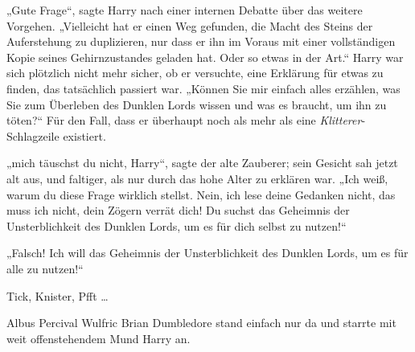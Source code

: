 „Gute Frage“, sagte Harry nach einer internen Debatte über das weitere Vorgehen.
„Vielleicht hat er einen Weg gefunden, die Macht des Steins der Auferstehung zu duplizieren, nur dass er ihn im Voraus mit einer vollständigen Kopie seines Gehirnzustandes geladen hat. Oder so etwas in der Art.“ Harry war sich plötzlich nicht mehr sicher, ob er versuchte, eine Erklärung für etwas zu finden, das tatsächlich passiert war.
„Können Sie mir einfach alles erzählen, was Sie zum Überleben des Dunklen Lords wissen und was es braucht, um ihn zu töten?“ Für den Fall, dass er überhaupt noch als mehr als eine \emph{Klitterer}-Schlagzeile existiert.

„mich täuschst du nicht, Harry“, sagte der alte Zauberer; sein Gesicht sah jetzt alt aus, und faltiger, als nur durch das hohe Alter zu erklären war.
„Ich weiß, warum du diese Frage wirklich stellst. Nein, ich lese deine Gedanken nicht, das muss ich nicht, dein Zögern verrät dich! Du suchst das Geheimnis der Unsterblichkeit des Dunklen Lords, um es für dich selbst zu nutzen!“

„Falsch! Ich will das Geheimnis der Unsterblichkeit des Dunklen Lords, um es für alle zu nutzen!“

\later

Tick, Knister, Pfft …

Albus Percival Wulfric Brian Dumbledore stand einfach nur da und starrte mit weit offenstehendem Mund Harry an.

